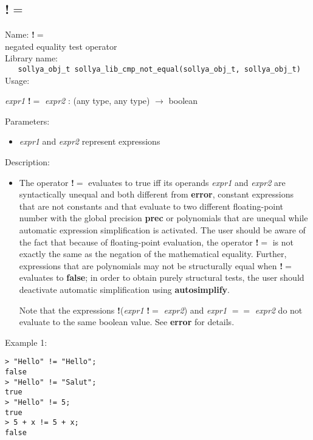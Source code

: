 \subsection{!$=$}
\label{labneq}
\noindent Name: \textbf{!$=$}\\
\phantom{aaa}negated equality test operator\\[0.2cm]
\noindent Library name:\\
\verb|   sollya_obj_t sollya_lib_cmp_not_equal(sollya_obj_t, sollya_obj_t)|\\[0.2cm]
\noindent Usage: 
\begin{center}
\emph{expr1} \textbf{!$=$} \emph{expr2} : (\textsf{any type}, \textsf{any type}) $\rightarrow$ \textsf{boolean}\\
\end{center}
Parameters: 
\begin{itemize}
\item \emph{expr1} and \emph{expr2} represent expressions
\end{itemize}
\noindent Description: \begin{itemize}

\item The operator \textbf{!$=$} evaluates to true iff its operands \emph{expr1} and
   \emph{expr2} are syntactically unequal and both different from \textbf{error},
   constant expressions that are not constants and that evaluate to two
   different floating-point number with the global precision \textbf{prec} or 
   polynomials that are unequal while automatic expression simplification 
   is activated. The user should be aware of the fact that because of 
   floating-point evaluation, the operator \textbf{!$=$} is not exactly the 
   same as the negation of the mathematical equality. Further, expressions 
   that are polynomials may not be structurally equal when \textbf{!$=$} evaluates 
   to \textbf{false}; in order to obtain purely structural tests, the user should 
   deactivate automatic simplification using \textbf{autosimplify}.
     
   Note that the expressions \textbf{!}(\emph{expr1} \textbf{!$=$} \emph{expr2}) and \emph{expr1}
   \textbf{$==$} \emph{expr2} do not evaluate to the same boolean value. See \textbf{error}
   for details.
\end{itemize}
\noindent Example 1: 
\begin{center}\begin{minipage}{15cm}\begin{Verbatim}[frame=single]
> "Hello" != "Hello";
false
> "Hello" != "Salut";
true
> "Hello" != 5;
true
> 5 + x != 5 + x;
false
\end{Verbatim}
\end{minipage}\end{center}
